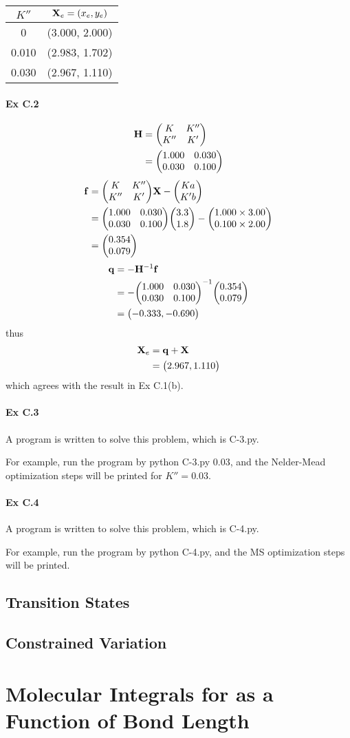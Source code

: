 \documentclass[a4paper]{article}
\newcommand{\ex}[1]{\paragraph{Ex #1}}
\numberwithin{equation}{subsection}
\newcommand{\code}[1]{\colorbox{codegray}{{\Consolas#1}}}
\begin{document}
\begin{table}
	\centering
	\begin{tabular}{cc}
		\hline
		$ K'' $ & $ \vb{X}_e = (x_e, y_e) $\\ \hline
		0 & (3.000, 2.000)\\
		0.010 & (2.983, 1.702)\\
		0.030 & (2.967, 1.110)\\ \hline
	\end{tabular}
\end{table}

\ex{C.2}
\begin{align}
\vb{H} 
&= \mqty(K & K'' \\ K'' & K') \notag\\
&= \mqty(1.000 & 0.030\\ 0.030 & 0.100)
\end{align}
\begin{align}
\vb{f} 
&= \mqty(K & K'' \\ K'' & K')\vb{X} - \mqty(K a \\ K' b) \notag\\
&= \mqty(1.000 & 0.030\\ 0.030 & 0.100)\mqty(3.3\\ 1.8) 
- \mqty(1.000\times 3.00\\ 0.100\times 2.00) \notag\\
&= \mqty(0.354\\ 0.079)
\end{align}
\begin{align}
\vb{q} &= -\vb{H}^{-1}\vb{f} \notag\\
&= -\mqty(1.000 & 0.030\\ 0.030 & 0.100)^{-1} \mqty(0.354\\ 0.079) \notag\\
&= \mqty(-0.333, -0.690)
\end{align}
thus
\begin{align}
\vb{X}_e &= \vb{q} + \vb{X} \notag\\
&= \mqty(2.967, 1.110)
\end{align}
which agrees with the result in Ex C.1(b).

\ex{C.3}
A program is written to solve this problem, which is \code{C-3.py}. 

For example, run the program by
\code{python C-3.py 0.03}, and the Nelder-Mead optimization steps will be printed for $ K'' = 0.03 $.

\ex{C.4}
A program is written to solve this problem, which is \code{C-4.py}. 

For example, run the program by
\code{python C-4.py}, and the MS optimization steps will be printed.

\subsection{Transition States}

\subsection{Constrained Variation}

\section{Molecular Integrals for  as a Function of Bond Length}
\end{document}
